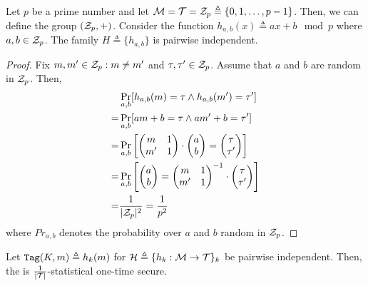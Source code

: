 \begin{theorem}
	Let $p$ be a prime number and let $\mathcal{M} = \mathcal{T} = \mathcal{Z}_p \triangleq \{0, 1, \dots, p-1\}$.
	Then, we can define the group $(\mathcal{Z}_p, +)$.
	Consider the function $h_{a,b}(x) \triangleq ax + b \mod p$ where $a, b \in \mathcal{Z}_p$.
    The family $H \triangleq \{h_{a,b}\}$ is pairwise independent.
\end{theorem}
\begin{proof}
	Fix $m, m' \in \mathcal{Z}_p : m \neq m'$ and $\tau, \tau' \in \mathcal{Z}_p$.
	Assume that $a$ and $b$ are random in $\mathcal{Z}_p$. Then,
    \begin{align*}
        & \Pr_{a,b}[h_{a,b}(m) = \tau \wedge h_{a,b}(m') = \tau'] \\
        = & \Pr_{a,b}[am+b = \tau \wedge am'+b = \tau'] \\
        = & \Pr_{a,b}\left[\begin{pmatrix}
        	m & 1 \\
            m' & 1
        \end{pmatrix} \cdot \begin{pmatrix}
            a \\
            b
        \end{pmatrix} = \begin{pmatrix}
            \tau \\
            \tau'
        \end{pmatrix}\right] \\
        = & \Pr_{a,b}\left[\begin{pmatrix}
            a \\
            b
        \end{pmatrix} = \begin{pmatrix}
            m & 1 \\
            m' & 1
        \end{pmatrix}^{-1} \cdot \begin{pmatrix}
            \tau \\
            \tau'
        \end{pmatrix}\right] \\
        = & \frac{1}{|\mathcal{Z}_p|^2} = \frac{1}{p^2}
    \end{align*}
    where $Pr_{a,b}$ denotes the probability over $a$ and $b$ random in $\mathcal{Z}_p$.
\end{proof}

\begin{theorem}
    Let $\texttt{Tag}(K,m) \triangleq h_k(m)$ for $\mathcal{H} \triangleq \{h_k : \mathcal{M} \to \mathcal{T} \}_k$ be pairwise independent. 
    Then, the \Mac{} is $\frac{1}{|\mathcal{T}|}$-statistical one-time secure. 
\end{theorem}

